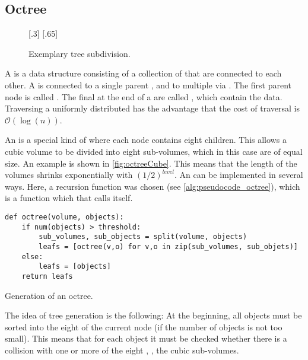 \subsection{Octree}\label{sec:octree}
%
\begin{figure}[!t]
    \centering
    [.3\textwidth]{
    \def\tikzheight{0.6\textwidth}
    }
    \hfill
    [.65\textwidth]{
    \def\tikzheight{0.6\textwidth}
    }
	\caption{Exemplary tree subdivision.}
	\label{fig:octree}
\end{figure}
%
A  is a data structure consisting of a collection of  that are connected to each other.
A  is connected to a single parent , and to multiple  via .
The first parent node is called .
The final  at the end of a  are called , which contain the data.
Traversing a uniformly distributed  has the advantage that the cost of traversal is $\mathcal{O}(\log(n))$.
\par
%
An  is a special kind of  where each node contains eight children.
This allows a cubic volume to be divided into eight sub-volumes, which in this case are of equal size.
An example is shown in \cref{fig:octreeCube}.
This means that the length of the volumes shrinks exponentially with $(1/2)^\mathit{level}$.
An  can be implemented in several ways.
Here, a recursion function was chosen (see \cref{alg:pseudocode_octree}), which is a function which that calls itself.
%
\begin{lstfloat}[!tb]
\lstset{style=python}
\begin{lstlisting}[]
def octree(volume, objects):
    if num(objects) > threshold:
        sub_volumes, sub_objects = split(volume, objects)
        leafs = [octree(v,o) for v,o in zip(sub_volumes, sub_objets)]
    else:
        leafs = [objects]
    return leafs
\end{lstlisting}
\caption{Generation of an octree.}
\label{alg:pseudocode_octree}
\end{lstfloat}
%
The idea of tree generation is the following:
At the beginning, all objects must be sorted into the eight  of the current node (if the number of objects is not too small).
This means that for each object it must be checked whether there is a collision with one or more of the eight , \ie{}, the cubic sub-volumes.
